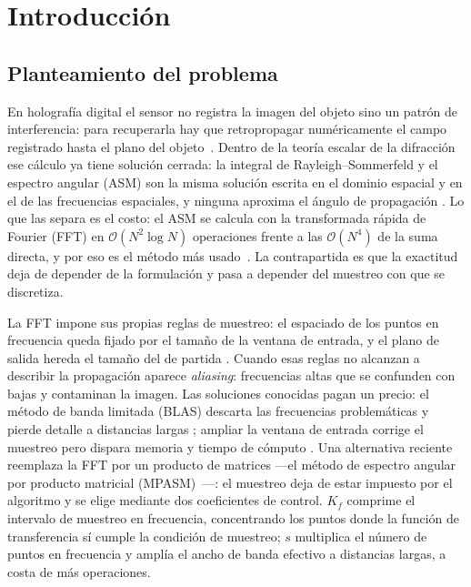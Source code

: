 \chapter{Introducción}
\label{cap:introduccion}

\section{Planteamiento del problema}
\label{sec:planteamiento}

En holografía digital el sensor no registra la imagen del objeto sino un patrón
de interferencia: para recuperarla hay que retropropagar numéricamente el campo
registrado hasta el plano del objeto~\cite{buitrago2022}. Dentro de la teoría escalar
de la difracción ese cálculo ya tiene solución cerrada: la integral de
Rayleigh--Sommerfeld y el espectro angular (ASM) son la misma solución escrita
en el dominio espacial y en el de las frecuencias espaciales, y ninguna aproxima
el ángulo de propagación \cite{goodman2005, ersoy2006}. Lo que las separa es el
costo: el ASM se calcula con la transformada rápida de Fourier (FFT) en
$\mathcal{O}(N^2\log N)$ operaciones frente a las $\mathcal{O}(N^4)$ de la suma
directa, y por eso es el método más usado~\cite{buitrago2020}. La contrapartida
es que la exactitud deja de depender de la formulación y pasa a depender del
muestreo con que se discretiza.

La FFT impone sus propias reglas de muestreo: el espaciado de los puntos en
frecuencia queda fijado por el tamaño de la ventana de entrada, y el plano de
salida hereda el tamaño del de partida \cite{goodman2005}. Cuando esas reglas no
alcanzan a describir la propagación aparece \emph{aliasing}: frecuencias altas
que se confunden con bajas y contaminan la imagen. Las soluciones conocidas
pagan un precio: el método de banda limitada (BLAS) descarta las frecuencias
problemáticas y pierde detalle a distancias largas \cite{matsushima2009};
ampliar la ventana de entrada corrige el muestreo pero dispara memoria y tiempo
de cómputo \cite{yu2012}. Una alternativa reciente reemplaza la FFT por un
producto de matrices ---el método de espectro angular por producto matricial
(MPASM)~\cite{zhao2020}---: el muestreo deja de estar impuesto por el algoritmo
y se elige mediante dos coeficientes de control. $K_f$ comprime el intervalo de
muestreo en frecuencia, concentrando los puntos donde la función de
transferencia sí cumple la condición de muestreo; $s$ multiplica el número de
puntos en frecuencia y amplía el ancho de banda efectivo a distancias largas, a
costa de más operaciones.

